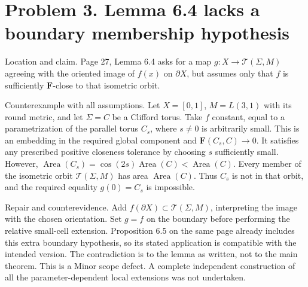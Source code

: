 \documentclass[10pt]{article}
\begin{document}
\section*{Problem 3. Lemma 6.4 lacks a boundary membership hypothesis}
Location and claim. Page 27, Lemma 6.4 asks for a map \(g:X\to\mathcal T(\Sigma,M)\) agreeing with the oriented image of \(f(x)\) on \(\partial X\), but assumes only that \(f\) is sufficiently \(\mathbf F\)-close to that isometric orbit.\par
Counterexample with all assumptions. Let \(X=[0,1]\), \(M=L(3,1)\) with its round metric, and let \(\Sigma=C\) be a Clifford torus. Take \(f\) constant, equal to a parametrization of the parallel torus \(C_s\), where \(s\ne0\) is arbitrarily small. This is an embedding in the required global component and \(\mathbf F(C_s,C)\to0\). It satisfies any prescribed positive closeness tolerance by choosing \(s\) sufficiently small. However, \(\operatorname{Area}(C_s)=\cos(2s)\operatorname{Area}(C)<\operatorname{Area}(C)\). Every member of the isometric orbit \(\mathcal T(\Sigma,M)\) has area \(\operatorname{Area}(C)\). Thus \(C_s\) is not in that orbit, and the required equality \(g(0)=C_s\) is impossible.\par
Repair and counterevidence. Add \(f(\partial X)\subset\mathcal T(\Sigma,M)\), interpreting the image with the chosen orientation. Set \(g=f\) on the boundary before performing the relative small-cell extension. Proposition 6.5 on the same page already includes this extra boundary hypothesis, so its stated application is compatible with the intended version. The contradiction is to the lemma as written, not to the main theorem. This is a Minor scope defect. A complete independent construction of all the parameter-dependent local extensions was not undertaken.\par
\end{document}
